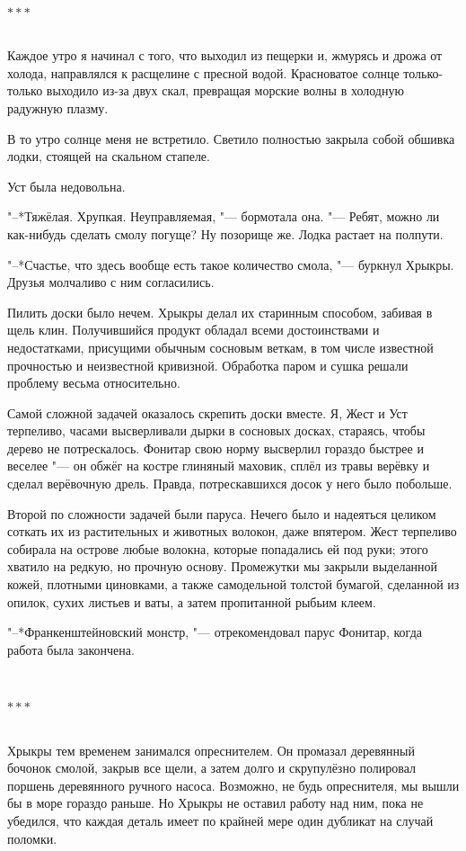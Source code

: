 \documentclass[a4paper,12pt,fleqn]{book}
\newcommand{\razd}{~\\{\centering\Large\bfseries$\ast \ast \ast$\par}~\\}
\begin{document}
\razd

Каждое утро я начинал с того, что выходил из пещерки и, жмурясь и дрожа от холода, направлялся к расщелине с пресной водой.
Красноватое солнце только-только выходило из-за двух скал, превращая морские волны в холодную радужную плазму.

В то утро солнце меня не встретило.
Светило полностью закрыла собой обшивка лодки, стоящей на скальном стапеле.

Уст была недовольна.

"--*Тяжёлая.
Хрупкая.
Неуправляемая, "--- бормотала она.
"--- Ребят, можно ли как-нибудь сделать смолу погуще?
Ну позорище же.
Лодка растает на полпути.

"--*Счастье, что здесь вообще есть такое количество смола, "--- буркнул Хрыкры.
Друзья молчаливо с ним согласились.

Пилить доски было нечем.
Хрыкры делал их старинным способом, забивая в щель клин.
Получившийся продукт обладал всеми достоинствами и недостатками, присущими обычным сосновым веткам, в том числе известной прочностью и неизвестной кривизной.
Обработка паром и сушка решали проблему весьма относительно.

Самой сложной задачей оказалось скрепить доски вместе.
Я, Жест и Уст терпеливо, часами высверливали дырки в сосновых досках, стараясь, чтобы дерево не потрескалось.
Фонитар свою норму высверлил гораздо быстрее и веселее "--- он обжёг на костре глиняный маховик, сплёл из травы верёвку и сделал верёвочную дрель.
Правда, потрескавшихся досок у него было побольше.

Второй по сложности задачей были паруса.
Нечего было и надеяться целиком соткать их из растительных и животных волокон, даже впятером.
Жест терпеливо собирала на острове любые волокна, которые попадались ей под руки;
этого хватило на редкую, но прочную основу.
Промежутки мы закрыли выделанной кожей, плотными циновками, а также самодельной толстой бумагой, сделанной из опилок, сухих листьев и ваты, а затем пропитанной рыбьим клеем.

"--*Франкенштейновский монстр, "--- отрекомендовал парус Фонитар, когда работа была закончена.

\razd

Хрыкры тем временем занимался опреснителем.
Он промазал деревянный бочонок смолой, закрыв все щели, а затем долго и скрупулёзно полировал поршень деревянного ручного насоса.
Возможно, не будь опреснителя, мы вышли бы в море гораздо раньше.
Но Хрыкры не оставил работу над ним, пока не убедился, что каждая деталь имеет по крайней мере один дубликат на случай поломки.
\end{document}
